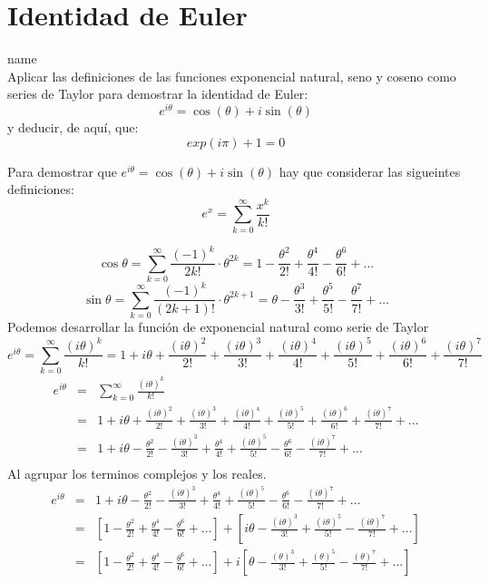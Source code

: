 \documentclass[12pt]{article}
\begin{document}
\section{Identidad de Euler} name \\

Aplicar las definiciones de las funciones exponencial natural, seno y coseno como series de Taylor para demostrar la identidad de Euler:
\[e^{i\theta} = \cos(\theta) + i \sin(\theta)\]
y deducir, de aquí, que:
\[exp(i\pi) + 1 = 0\]

Para demostrar que $e^{i\theta} = \cos(\theta) + i \sin(\theta)$ hay que considerar las sigueintes definiciones:
\[
e^x = \sum_{k=0}^{\infty}\frac{x^{k}}{k!}
\]

\[
\cos\theta = \sum_{k=0}^{\infty}\frac{(-1)^{k}}{2k!} \cdot \theta ^{2k} = 1- \frac{\theta^2}{2!} + \frac{\theta ^4}{4!} -   \frac{\theta^6}{6!} + \ldots
\]
\[
\sin\theta = \sum_{k=0}^{\infty}\frac{(-1)^{k}}{(2k+1)!} \cdot \theta ^{2k+1} =  \theta - \frac{\theta^3}{3!} + \frac{\theta ^5}{5!} -   \frac{\theta^7}{7!} + \ldots
\]
Podemos desarrollar la función de exponencial natural como serie de Taylor
\[
e^{i\theta} = \sum_{k=0}^{\infty}\frac{(i\theta)^{k}}{k!} = 1 + i\theta+ \frac{(i\theta)^2}{2!} + \frac{(i\theta)^3}{3!}+ \frac{(i\theta)^4}{4!}+ \frac{(i\theta)^5}{5!} + \frac{(i\theta)^6}{6!} + \frac{(i\theta)^7}{7!}     
\]
\begin{eqnarray}
e^{i\theta} 
& = &   \sum_{k=0}^{\infty}\frac{(i\theta)^{k}}{k!} \nonumber
\\
& = & 1 + i\theta + \frac{(i\theta)^2}{2!} + \frac{(i\theta)^3}{3!}+ \frac{(i\theta)^4}{4!}+ \frac{(i\theta)^5}{5!} + \frac{(i\theta)^6}{6!} + \frac{(i\theta)^7}{7!}+ \ldots  \nonumber
\\
& = &  1 + i\theta - \frac{\theta^2}{2!} - \frac{(i\theta)^3}{3!}+ \frac{\theta^4}{4!}+ \frac{(i\theta)^5}{5!} - \frac{\theta^6}{6!} - \frac{(i\theta)^7}{7!}+ \ldots  \nonumber
\\\nonumber
\end{eqnarray}
Al agrupar los terminos complejos y los reales.
\begin{eqnarray}
e^{i\theta} 
& = &  1 + i\theta - \frac{\theta^2}{2!} - \frac{(i\theta)^3}{3!}+ \frac{\theta^4}{4!}+ \frac{(i\theta)^5}{5!} - \frac{\theta^6}{6!} - \frac{(i\theta)^7}{7!}+ \ldots  \nonumber
\\
& = &  [1 - \frac{\theta^2}{2!} + \frac{\theta^4}{4!}- \frac{\theta^6}{6!} + \ldots ]+[i\theta   - \frac{(i\theta)^3}{3!}+ \frac{(i\theta)^5}{5!} - \frac{(i\theta)^7}{7!}+ \ldots]  \nonumber
\\
& = &  [1 - \frac{\theta^2}{2!} + \frac{\theta^4}{4!}- \frac{\theta^6}{6!} + \ldots ]+i[\theta   - \frac{(\theta)^3}{3!}+ \frac{(\theta)^5}{5!} - \frac{(\theta)^7}{7!}+ \ldots]  \nonumber
\\\nonumber
\end{eqnarray}
\end{document}
